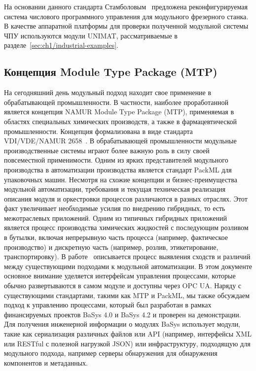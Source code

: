 На основании данного стандарта Стамболовым~\cite{stambolov2013development} предложена реконфигурируемая система числового программного управления для модульного фрезерного станка. В качестве аппаратной платформы для проверки полученной модульной системы ЧПУ используются модули UNIMAT, рассматриваемые в разделе~\cref{sec:ch1/industrial-examples}. 

\subsection{Концепция Module Type Package (MTP)}

На сегодняшний день модульный подход находит свое применение в обрабатывающей промышленности. В частности, наиболее проработанной является концепция NAMUR Module Type Package (MTP), применяемая в областях специальных химических производств, а также в фармацевтической промышленности. Концепция формализована в виде стандарта VDI/VDE/NAMUR 2658~\cite{bernshausen2016namur}. В обрабатывающей промышленности модульные производственные системы играют более важную роль в силу своей повсеместной применимости. Одним из ярких представителей модульного производства в автоматизации производства является стандарт PackML для упаковочных машин. Несмотря на схожие концепции и бизнес-преимущества модульной автоматизации, требования и текущая техническая реализация описания модуля и оркестровки процессов различаются в разных отраслях. Этот факт увеличивает необходимые усилия по внедрению гибридных, то есть межотраслевых приложений. Одним из типичных гибридных приложений является процесс производства химических жидкостей с последующим розливом в бутылки, включая непрерывную часть процесса (например, фактическое производство) и дискретную часть (например, розлив, этикетирование, транспортировку). В работе~\cite{grothoff2020mapping} описывается процесс выявления сходств и различий между существующими подходами к модульной автоматизации. В этом документе основное внимание уделяется интерфейсам управления процессами, которые обычно развертываются в самом модуле и доступны через OPC UA. Наряду с существующими стандартами, такими как MTP и PackML, мы также обсуждаем подход к управлению процессами, который был разработан в рамках финансируемых проектов BaSys 4.0 и BaSys 4.2 и проверен на демонстрации. Для получения инженерной информации о модулях BaSys использует модули, такие как сериализация различных файлов или API (например, интерфейсы XML или RESTful с полезной нагрузкой JSON) или инфраструктуру, подходящую для модульного подхода, например серверы обнаружения для обнаружения компонентов и метаданных.

